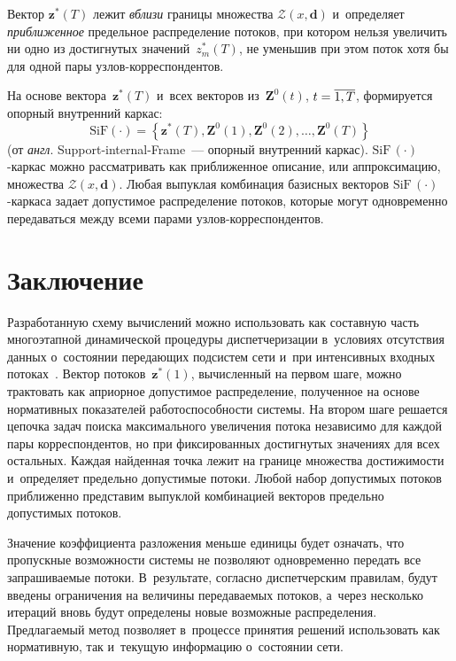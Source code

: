 \begin{multicols}{2}
Вектор $\mathbf{z}^*(T)$ лежит  \textit{вблизи} 
границы множества $\mathcal{Z}(x, \mathbf{d})$ и~определяет 
\textit{приближенное} предельное  распределение потоков, 
при котором нельзя увеличить ни одно из достигнутых значений~$z_m^*(T)$, 
не уменьшив при этом поток хотя бы для одной пары уз\-лов-кор\-рес\-пон\-ден\-тов.

На основе вектора~$\mathbf{z}^*(T)$ и~всех векторов 
из~$\mathbf{Z}^0(t)$, $t \hm= \overline{1, T}$, формируется опорный 
внутренний  каркас:
$$ 
\mathrm{SiF}\left (\cdot\right) =\left\{\textbf{z}^*(T), \mathbf{Z}^0(1), \mathbf{Z}^0(2), 
\ldots, \mathbf{Z}^0(T)\right\}
$$
(от \textit{англ}. Support-internal-Frame~--- опорный внут\-рен\-ний каркас). 
$\mathrm{SiF}\,(\cdot)$-кар\-кас можно рас\-смат\-ривать как приближенное описание, 
или ап\-про\-к\-симацию, множества $\mathcal{Z}(x, \mathbf{d})$. 
Любая выпуклая комбинация базисных векторов $\mathrm{SiF}\,(\cdot)$-кар\-ка\-са 
задает допустимое распределение потоков, которые могут одновременно 
передаваться между всеми парами уз\-лов-кор\-рес\-пон\-ден\-тов. 

\section{Заключение}

Разработанную схему вычислений можно использовать как  составную 
часть многоэтапной  динамической  процедуры диспетчеризации в~условиях 
отсутствия данных о~состоянии  передающих\linebreak
 подсистем сети  и~при  
интенсивных  входных потоках~\cite{Mal19-6}.  Вектор потоков~$\mathbf{z}^*(1)$, 
вычисленный на первом шаге, можно трактовать как априорное  допустимое  
распределение,  полученное  на основе  \mbox{нормативных} показателей 
работоспособности сис\-те\-мы. На втором шаге решается цепочка задач 
поиска максимального увеличения потока  независимо для каждой пары 
корреспондентов, но при фиксированных достигнутых  значениях для 
всех остальных. Каждая   найденная точка  лежит на границе множества 
достижимости и~определяет   предельно до\-пус\-ти\-мые потоки.  Любой набор 
до\-пус\-ти\-мых   потоков приближенно  представим выпуклой комбинацией  
векторов предельно допустимых потоков.

Значение коэффициента разложения меньше  единицы будет означать, 
что пропускные возможности системы не позволяют одновременно передать 
все запрашиваемые  потоки.  В~результате,  согласно диспетчерским правилам, 
будут введены  ограничения на величины передаваемых потоков, 
а~через несколько   итераций  вновь будут определены новые возможные   
распределения.  Пред\-ла\-га\-емый метод позволяет в~процессе принятия решений  
использовать как нормативную, так и~текущую информацию о~состоянии сети.  


\end{multicols}
